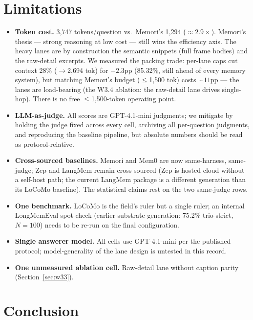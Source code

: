 \documentclass[11pt]{article}
\begin{document}
\section{Limitations}

\begin{itemize}[leftmargin=1.4em]
\item \textbf{Token cost.} 3{,}747 tokens/question vs.\ Memori's
  1{,}294 ($\approx 2.9\times$). Memori's thesis --- strong reasoning
  at low cost --- still wins the efficiency axis. The heavy lanes are
  by construction the semantic snippets (full frame bodies) and the
  raw-detail excerpts. We measured the packing trade: per-lane caps
  cut context 28\% ($\to$2{,}694 tok) for $-2.3$pp (85.32\%, still
  ahead of every memory system), but matching Memori's budget
  ($\le$1{,}500 tok) costs ${\sim}11$pp --- the lanes are load-bearing
  (the W3.4 ablation: the raw-detail lane drives single-hop). There is
  no free $\le$1{,}500-token operating point.
\item \textbf{LLM-as-judge.} All scores are GPT-4.1-mini judgments;
  we mitigate by holding the judge fixed across every cell, archiving
  all per-question judgments, and reproducing the baseline pipeline,
  but absolute numbers should be read as protocol-relative.
\item \textbf{Cross-sourced baselines.} Memori and Mem0 are now
  same-harness, same-judge; Zep and LangMem remain cross-sourced (Zep
  is hosted-cloud without a self-host path; the current LangMem package
  is a different generation than its LoCoMo baseline). The statistical
  claims rest on the two same-judge rows.
\item \textbf{One benchmark.} LoCoMo is the field's ruler but a single
  ruler; an internal LongMemEval spot-check (earlier substrate
  generation: 75.2\% trio-strict, $N{=}100$) needs to be re-run on the
  final configuration.
\item \textbf{Single answerer model.} All cells use GPT-4.1-mini per
  the published protocol; model-generality of the lane design is
  untested in this record.
\item \textbf{One unmeasured ablation cell.} Raw-detail lane without
  caption parity (Section~\ref{sec:w33}).
\end{itemize}

\section{Conclusion}
\end{document}
